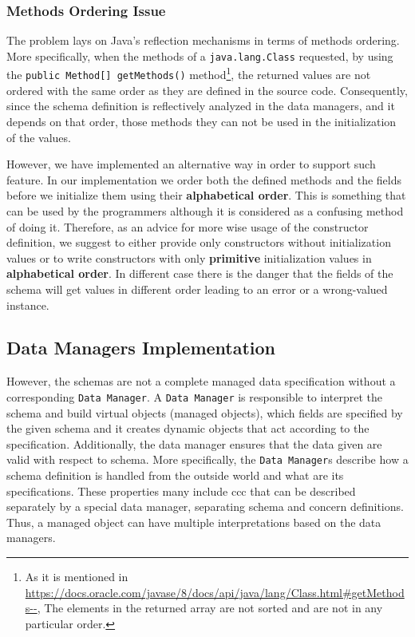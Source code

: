 \subsubsection{Methods Ordering Issue}\label{Methods ordering}
The problem lays on Java's reflection mechanisms in terms of methods ordering.
More specifically, when the methods of a \texttt{java.lang.Class} requested, by using the \texttt{public Method[] getMethods()} method\footnote{As it is mentioned in \url{https://docs.oracle.com/javase/8/docs/api/java/lang/Class.html\#getMethods--}, The elements in the returned array are not sorted and are not in any particular order.}, the returned values are not ordered with the same order as they are defined in the source code.
Consequently, since the schema definition is reflectively analyzed in the data managers, and it depends on that order, those methods they can not be used in the initialization of the values.

However, we have implemented an alternative way in order to support such feature.
In our implementation we order both the defined methods and the fields before we initialize them using their \textbf{alphabetical order}.
This is something that can be used by the programmers although it is considered as a confusing method of doing it.
Therefore, as an advice for more wise usage of the constructor definition, we suggest to either provide only constructors without initialization values or to write constructors with only \textbf{primitive} initialization values in \textbf{alphabetical order}.
In different case there is the danger that the fields of the schema will get values in different order leading to an error or a wrong-valued instance.

\subsection{Data Managers Implementation}\label{Data Managers Implementation}
However, the schemas are not a complete managed data specification without a corresponding \texttt{Data Manager}.
A \texttt{Data Manager} is responsible to interpret the schema and build virtual objects (managed objects), which fields are specified by the given schema and it creates dynamic objects that act according to the specification.
Additionally, the data manager ensures that the data given are valid with respect to schema.
More specifically, the \texttt{Data Manager}s describe how a schema definition is handled from the outside world and what are its specifications.
These properties many include \ac{ccc} that can be described separately by a special data manager, separating schema and concern definitions.
Thus, a managed object can have multiple interpretations based on the data managers.

